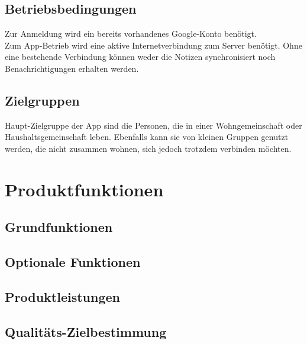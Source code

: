 \documentclass[a4paper]{scrreprt}
\begin{document}
        \section{Betriebsbedingungen}
        Zur Anmeldung wird ein bereits vorhandenes Google-Konto benötigt. \\
        Zum App-Betrieb wird eine aktive Internetverbindung zum Server benötigt. Ohne eine bestehende Verbindung können weder die Notizen synchronisiert noch Benachrichtigungen erhalten werden.
        
        \section{Zielgruppen}
        Haupt-Zielgruppe der App sind die Personen, die in einer Wohngemeinschaft oder Haushaltsgemeinschaft leben. Ebenfalls kann sie von kleinen Gruppen genutzt werden, die nicht zusammen wohnen, sich jedoch trotzdem verbinden möchten.
        

    \chapter{Produktfunktionen}
    		\section{Grundfunktionen}
    		
    		\section{Optionale Funktionen}
    		
    		\section{Produktleistungen}
    		
    		\section{Qualitäts-Zielbestimmung}
\end{document}
